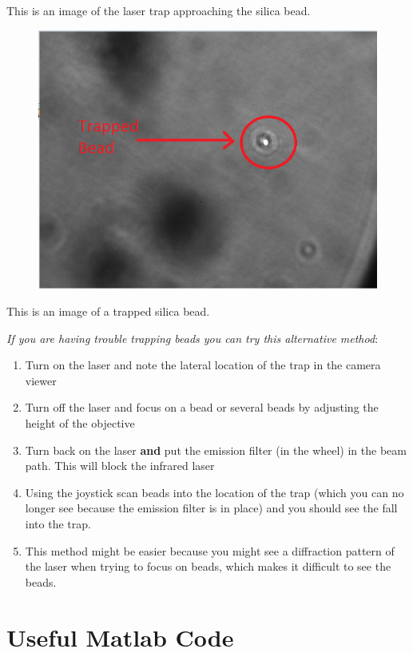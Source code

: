 \documentclass{../lab}
\begin{document}
This is an image of the laser trap approaching the silica bead.


\begin{figure}[h]
    \centering
    \href{http://experimentationlab.berkeley.edu/sites/default/files/OTZ/trapped.png}{\includegraphics[width=0.5\linewidth]{images/trapped.png}}
    \caption{}
    \label{fig:trapped}
\end{figure}

This is an image of a trapped silica bead.

\emph{If you are having trouble trapping beads you can try this alternative method}:

\begin{enumerate}
    \item Turn on the laser and note the lateral location of the trap in the camera viewer

    \item Turn off the laser and focus on a bead or several beads by adjusting the height of the objective

    \item Turn back on the laser \textbf{and} put the emission filter (in the wheel) in the beam path. This will block the infrared laser

    \item Using the joystick scan beads into the location of the trap (which you can no longer see because the emission filter is in place) and you should see the fall into the trap.

    \item This method might be easier because you might see a diffraction pattern of the laser when trying to focus on beads, which makes it difficult to see the beads.

\end{enumerate}

\section{Useful Matlab Code}
\end{document}
